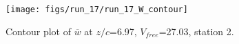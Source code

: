 \begin{figure}[H]
\centering
\texttt{[image: figs/run\_17/run\_17\_W\_contour]}
\caption{Contour plot of $\overline{w}$ at $z/c$=6.97, $V_{free}$=27.03, station 2.}
\label{fig:run_17_W_contour}
\end{figure}


